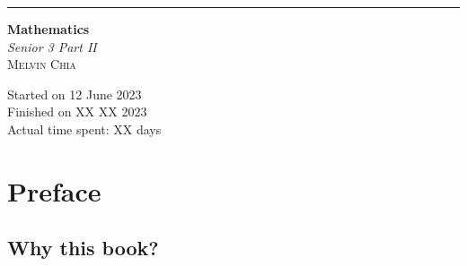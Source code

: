 \documentclass{report}
\begin{document}
\newcommand{\sol}[1]{

    \noindent \textbf{Sol.}
}
\newcommand{\prooff}[1]{

    \noindent \textbf{Proof.}
}

\newcommand{\sxrightarrow}[2][]{%
    \mathrel{\text{$\xrightarrow[#1]{#2}$}}%
}

\newenvironment{cequation}{
    \makeatletter
    \setbool{@fleqn}{false}
    \makeatother
    \begin{equation*}
        }{\end{equation*}}

\begin{titlepage}
    \raggedleft{}
    \rule{1pt}{\textheight}
    \hspace{0.02\textwidth}
    \parbox[b]{0.75\textwidth}{

    {\fontsize{40}{60}\selectfont\bfseries Mathematics}\\[2\baselineskip]
    {\huge\textit{Senior 3 Part II}}\\[4\baselineskip]
    {\Large\textsc{Melvin Chia}}

    \vspace{0.5\textheight}

    {\noindent Started on 12 June 2023}\\[\baselineskip]
    {\noindent Finished on XX XX 2023}\\[\baselineskip]
    {\noindent Actual time spent: XX days}\\[\baselineskip]}

\end{titlepage}

\onehalfspacing{}

\vspace{-10cm}
\titleformat{\chapter}[display]
{\normalfont\huge\bfseries}{\chaptertitlename\ \thechapter}{20pt}{\Huge}
\titlespacing*{\chapter}{0pt}{-20pt}{40pt}
\chapter*{Preface}
\section*{Why this book?}
\end{document}
